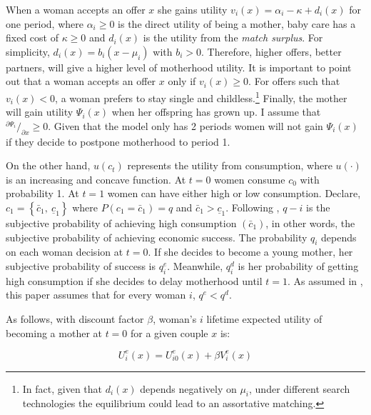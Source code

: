\documentclass[a4paper,10pt,twocolumn,preprint,3p,authoryear]{elsarticle}
\newcommand*\rfrac[2]{{}^{#1}\!/_{#2}}
\begin{document}
When a woman accepts an offer $x$ she gains utility $v_{i}\left(x \right)= \alpha_{i} - \kappa + d_{i}\left( x \right)$ for one period, where $\alpha_{i} \geq 0$ is the direct utility of being a mother, baby care has a fixed cost of $\kappa \geq 0$ and $d_{i}\left( x \right)$ is the utility from the \emph{match surplus}. For simplicity, $d_{i}\left( x \right)=b_{i}\left(x - \mu_{i}\right)$ with $b_{i}>0$. Therefore, higher offers, better partners, will give a higher level of motherhood utility. It is important to point out that a woman accepts an offer $x$ only if $v_{i}\left(x \right) \ge 0$. For offers such that $v_{i}\left(x \right) < 0$, a woman prefers to stay single and childless.\footnote{In fact, given that $d_{i}\left( x \right)$ depends negatively on $\mu_{i}$, under different search technologies the equilibrium could lead to an assortative matching.} Finally, the mother will gain utility $\Psi_{i}\left(x \right)$ when her offspring has grown up. I assume that $\rfrac{\partial \Psi_{i}}{\partial x} \geq 0$. Given that the model only has 2 periods women will not gain $\Psi_{i}\left(x \right)$ if they decide to postpone motherhood to period 1.

On the other hand, $u\left(c_{t}\right)$ represents the utility from consumption, where $u\left( \cdot \right)$ is an increasing and concave function. At $t=0$ women consume $c_{0}$ with probability 1. At $t=1$ women can have either high or low consumption. Declare, $c_{1}=\left\{\bar{c}_{1}, \ \underline{c}_{1}\right\}$ where $P\left(c_{1}=\bar{c}_{1} \right)=q$ and $\bar{c}_{1}>\underline{c}_{1}$. Following \citet{KearneyLevine2011}, $q-{i}$ is the subjective probability of achieving high consumption $\left( \bar{c}_{1} \right)$, in other words, the subjective probability of achieving economic success. The probability $q_{i}$ depends on each woman decision at $t=0$. If she decides to become a young mother, her subjective probability of success is $q_{i}^{e}$. Meanwhile, $q_{i}^{d}$ is her probability of getting high consumption if she decides to delay motherhood until $t=1$. As assumed in \citet{KearneyLevine2011}, this paper assumes that for every woman $i$, $q^{e}<q^{d}$. 

As follows, with discount factor $\beta$, woman's $i$ lifetime expected utility of becoming a mother at $t=0$ for a given couple $x$ is: 

\begin{equation}
	U_{i}^{e}\left( x \right)=U_{i0}^{e}\left(x\right)+\beta V_{i}^{e}\left( x \right)
	\label{eq:ExpU_EarlyMother}
\end{equation}
\end{document}
